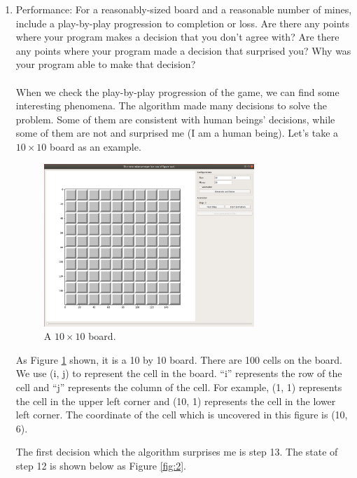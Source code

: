 \documentclass[letter]{article}
\begin{document}
\begin{enumerate}
	\label{han}
	\item {Performance: For a reasonably-sized board and a reasonable number of mines, include a play-by-play progression to completion or loss. Are there any points where your program makes a decision that you don’t agree with? Are there any points where your program made a decision that surprised you? Why was your program able to make that decision?} \\
	\\
	When we check the play-by-play progression of the game, we can find some interesting phenomena. The algorithm made many decisions to solve the problem. Some of them are consistent with human beings’ decisions, while some of them are not and surprised me (I am a human being). Let’s take a $ 10 \times 10 $ board as an example.
	
	\begin{figure}[H]
		\centering
		\includegraphics[width=0.75\textwidth]{../pics/1.png}
		\caption{\label{fig:1} A $ 10 \times 10 $ board.}
	\end{figure}
	As Figure \ref{fig:1} shown, it is a 10 by 10 board. There are 100 cells on the board. We use (i, j) to represent the cell in the board. ``i'' represents the row of the cell and ``j'' represents the column of the cell. For example, (1, 1) represents the cell in the upper left corner and (10, 1) represents the cell in the lower left corner. The coordinate of the cell which is uncovered in this figure is (10, 6).
	
	The first decision which the algorithm surprises me is step 13. The state of step 12 is shown below as Figure \ref{fig:2}.
	

\end{enumerate}
\end{document}
